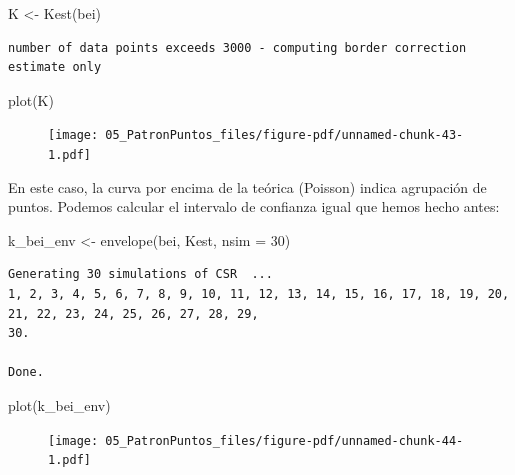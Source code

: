 \documentclass[
  letterpaper,
  DIV=11,
  numbers=noendperiod]{scrreprt}
\newenvironment{Shaded}{\begin{snugshade}}{\end{snugshade}}
\newcommand{\AttributeTok}[1]{\textcolor[rgb]{0.40,0.45,0.13}{#1}}
\newcommand{\DecValTok}[1]{\textcolor[rgb]{0.68,0.00,0.00}{#1}}
\newcommand{\FunctionTok}[1]{\textcolor[rgb]{0.28,0.35,0.67}{#1}}
\newcommand{\NormalTok}[1]{\textcolor[rgb]{0.00,0.23,0.31}{#1}}
\newcommand{\OtherTok}[1]{\textcolor[rgb]{0.00,0.23,0.31}{#1}}
\begin{document}
\begin{Shaded}
\begin{Highlighting}[]
\NormalTok{K }\OtherTok{\textless{}{-}} \FunctionTok{Kest}\NormalTok{(bei)}
\end{Highlighting}
\end{Shaded}

\begin{verbatim}
number of data points exceeds 3000 - computing border correction estimate only
\end{verbatim}

\begin{Shaded}
\begin{Highlighting}[]
\FunctionTok{plot}\NormalTok{(K)}
\end{Highlighting}
\end{Shaded}

\begin{figure}[H]

{\centering \texttt{[image: 05\_PatronPuntos\_files/figure-pdf/unnamed-chunk-43-1.pdf]}

}

\end{figure}

En este caso, la curva por encima de la teórica (Poisson) indica
agrupación de puntos. Podemos calcular el intervalo de confianza igual
que hemos hecho antes:

\begin{Shaded}
\begin{Highlighting}[]
\NormalTok{k\_bei\_env }\OtherTok{\textless{}{-}} \FunctionTok{envelope}\NormalTok{(bei, Kest, }\AttributeTok{nsim =} \DecValTok{30}\NormalTok{)}
\end{Highlighting}
\end{Shaded}

\begin{verbatim}
Generating 30 simulations of CSR  ...
1, 2, 3, 4, 5, 6, 7, 8, 9, 10, 11, 12, 13, 14, 15, 16, 17, 18, 19, 20,
21, 22, 23, 24, 25, 26, 27, 28, 29, 
30.

Done.
\end{verbatim}

\begin{Shaded}
\begin{Highlighting}[]
\FunctionTok{plot}\NormalTok{(k\_bei\_env)}
\end{Highlighting}
\end{Shaded}

\begin{figure}[H]

{\centering \texttt{[image: 05\_PatronPuntos\_files/figure-pdf/unnamed-chunk-44-1.pdf]}

}

\end{figure}
\end{document}
